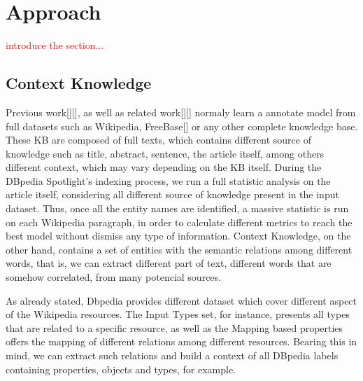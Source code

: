 \documentclass[10pt,a4paper]{article}
\newcommand{\todo}[1]{{\color{red}\textsf{\textbf{TODO}}: #1}}
\begin{document}



\section{Approach}
\textcolor{red}{introduce the section...} 

\subsection{Context Knowledge}

Previous work[][], as well as related work[][] normaly learn a annotate model from full datasets such as Wikipedia, FreeBase[] or any other complete knowledge base. These KB are composed of full texts, which contains different source of knowledge such as title, abstract, sentence, the article itself, among others different context, which may vary depending on the KB itself. During the DBpedia Spotlight's indexing process, we run a full statistic analysis on the article itself, considering all different  source of knowledge present in the input dataset. Thus, once all the entity names are identified, a massive statistic is run on each Wikipedia paragraph, in order to calculate different metrics to reach the best model without dismiss any type of information. Context Knowledge, on the other hand, contains a set of entities with the semantic relations among different words, that is, we can extract different part of text, different words that are somehow correlated, from many potencial sources.

As already stated, Dbpedia provides different dataset which cover different aspect of the Wikipedia resources. The Input Types set, for instance, presents all types that are related to a specific resource, as well as the Mapping based properties offers the mapping of different relations among different resources. Bearing this in mind, we can extract such relations and build a context of all DBpedia labels containing properties, objects and types, for example.
\end{document}
